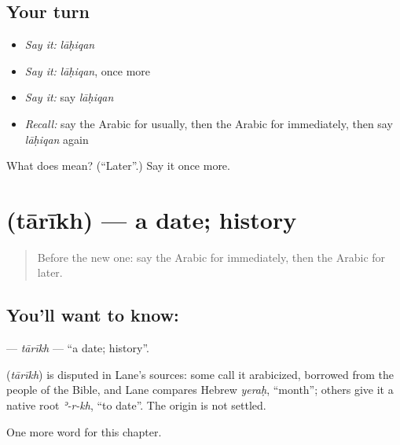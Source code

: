 \subsection*{Your turn}
\begin{itemize}
\raggedright
  \item \emph{Say it:} \emph{lāḥiqan}
  \item \emph{Say it:} \emph{lāḥiqan}, once more
  \item \emph{Say it:} say \emph{lāḥiqan}
  \item \emph{Recall:} say the Arabic for usually, then the Arabic for immediately, then say \emph{lāḥiqan} again
\end{itemize}

\begin{tcolorbox}[breakable,colback=teal!4,colframe=teal!35!black,title={Before you move on}]
What does  mean? (\textquotedblleft{}Later\textquotedblright{}.) Say it once more.
\end{tcolorbox}
\section[\texorpdfstring{\ar{تاريخ} (tārīkh)}{تاريخ (tārīkh)}]{ (tārīkh) — a date; history}

\label{lesson:AR-C202-tarikh}



\begin{quote}
Before the new one: say the Arabic for immediately, then the Arabic for later.
\end{quote}

\subsection*{You'll want to know: }
\textbf{} — \emph{tārīkh} — \textquotedblleft{}a date; history\textquotedblright{}.

\begin{cousinweb}
\textbf{} (\emph{tārīkh}) is disputed in Lane's sources: some call it arabicized, borrowed from the people of the Bible, and Lane compares Hebrew \emph{yeraḥ}, \textquotedblleft{}month\textquotedblright{}; others give it a native root \emph{ʾ-r-kh}, \textquotedblleft{}to date\textquotedblright{}. The origin is not settled.
\end{cousinweb}

\begin{grammarlens}[title={What you've built}]
One more word for this chapter.
\end{grammarlens}

